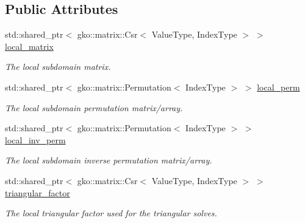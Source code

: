 \subsection*{Public Attributes}
\begin{DoxyCompactItemize}
\item 
\mbox{\label{classSchwarzWrappers_1_1SchwarzBase_acb13eabad587af925145b408946b8c2d}} 
std\+::shared\+\_\+ptr$<$ gko\+::matrix\+::\+Csr$<$ Value\+Type, Index\+Type $>$ $>$ \hyperlink{classSchwarzWrappers_1_1SchwarzBase_acb13eabad587af925145b408946b8c2d}{local\+\_\+matrix}
\begin{DoxyCompactList}\small\item\em The local subdomain matrix. \end{DoxyCompactList}\item 
\mbox{\label{classSchwarzWrappers_1_1SchwarzBase_a8cd51eb96cdf7f84de772fda54566a09}} 
std\+::shared\+\_\+ptr$<$ gko\+::matrix\+::\+Permutation$<$ Index\+Type $>$ $>$ \hyperlink{classSchwarzWrappers_1_1SchwarzBase_a8cd51eb96cdf7f84de772fda54566a09}{local\+\_\+perm}
\begin{DoxyCompactList}\small\item\em The local subdomain permutation matrix/array. \end{DoxyCompactList}\item 
\mbox{\label{classSchwarzWrappers_1_1SchwarzBase_ae8862a67facde156ffef342410f979ba}} 
std\+::shared\+\_\+ptr$<$ gko\+::matrix\+::\+Permutation$<$ Index\+Type $>$ $>$ \hyperlink{classSchwarzWrappers_1_1SchwarzBase_ae8862a67facde156ffef342410f979ba}{local\+\_\+inv\+\_\+perm}
\begin{DoxyCompactList}\small\item\em The local subdomain inverse permutation matrix/array. \end{DoxyCompactList}\item 
\mbox{\label{classSchwarzWrappers_1_1SchwarzBase_a3a11ec2c6d980ab0fcc0dc784e9244df}} 
std\+::shared\+\_\+ptr$<$ gko\+::matrix\+::\+Csr$<$ Value\+Type, Index\+Type $>$ $>$ \hyperlink{classSchwarzWrappers_1_1SchwarzBase_a3a11ec2c6d980ab0fcc0dc784e9244df}{triangular\+\_\+factor}
\begin{DoxyCompactList}\small\item\em The local triangular factor used for the triangular solves. \end{DoxyCompactList}\item 

\end{DoxyCompactItemize}
